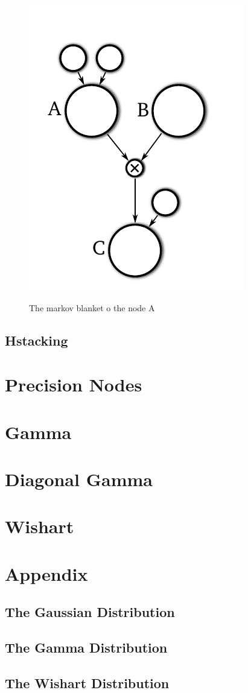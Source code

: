 \documentclass{article}
\begin{document}
\begin{figure}
\includegraphics{images/mult_markov}
\label{fig:mult_markov}
\caption{The markov blanket o the node A}
\end{figure}

\subsection{Hstacking}

\section{Precision Nodes}
\section{Gamma}
\section{Diagonal Gamma}
\section{Wishart}


\section{Appendix}
\subsection{The Gaussian Distribution}
\subsection{The Gamma Distribution}
\subsection{The Wishart Distribution}
\end{document}
